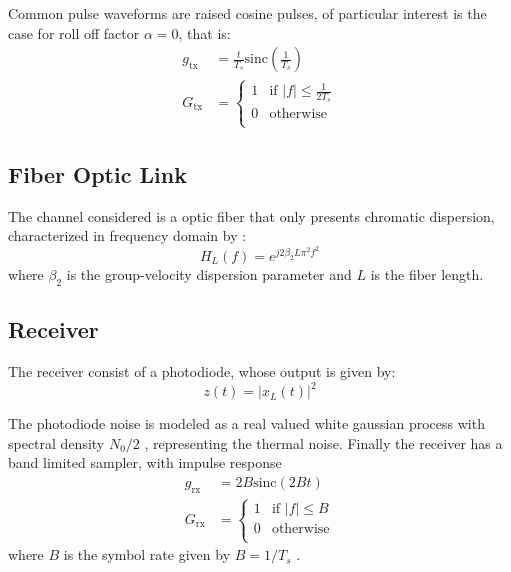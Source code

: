 Common pulse waveforms are raised cosine pulses, of particular interest is the case for roll off factor $\alpha=0$, that is:
\begin{align}
	g_\text{tx}&=\frac{t}{T_s}\text{sinc}\left(\frac{1}{T_s}\right)
	\label{eq:sinc_pulse_TD}\\
	G_\text{tx}&=\left\{
\begin{array}{ll}
1  &  \text{if }|f|\leq\frac{1}{2T_s}   \\
0  &  \text{otherwise} \\
\end{array}
\right.
\label{eq:sinc_pulse_FD}
\end{align}

\subsection{Fiber Optic Link}

The channel considered is a optic fiber that only presents chromatic dispersion, characterized in frequency domain by \cite{Plabst_DD}:
\begin{equation}
H_L(f)=e^{j2\beta_2L\pi^2f^2}
\end{equation}
where $\beta_2$ is the group-velocity dispersion parameter and $L$ is the fiber length.

\subsection{Receiver}
The receiver consist of a photodiode, whose output is given by:
\begin{equation}
z(t)=|x_L(t)|^2
\end{equation}

The photodiode noise is modeled as a real valued white gaussian process with spectral density $N_0/2$ \cite{Plabst_DD}, representing the thermal noise. Finally the receiver has a band limited sampler, with impulse response  
\begin{align}
	g_\text{rx}&=2B\text{sinc}\left(2Bt\right)\\
	G_\text{rx}&=\left\{
\begin{array}{ll}
1  &  \text{if }|f|\leq B   \\
0  &  \text{otherwise} \\
\end{array}
\right.
\end{align}
where $B$ is the symbol rate given by $B=1/T_s$ \cite{Plabst_DD}.



